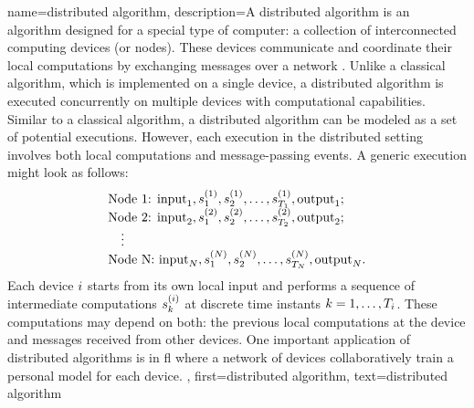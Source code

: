 {name={distributed algorithm},
	description={A distributed \gls{algorithm} is an \gls{algorithm} designed for 
		a special type of computer: a collection of interconnected computing devices (or nodes). 
		These devices communicate and coordinate their local computations by exchanging 
		messages over a network \cite{IntroDistAlg,ParallelDistrBook}. Unlike a classical \gls{algorithm}, 
		which is implemented on a single \gls{device}, a distributed \gls{algorithm} is 
		executed concurrently on multiple \gls{device}s with computational capabilities. 
		Similar to a classical \gls{algorithm}, a distributed \gls{algorithm} can be modeled as a 
		set of potential executions. However, each execution in the distributed setting involves 
		both local computations and message-passing events. A generic execution might look as 
		follows:
		\[
		\begin{array}{l}
			\text{Node 1: } {\rm input}_1, s_1^{(1)}, s_2^{(1)}, \ldots, s_{T_1}^{(1)}, {\rm output}_1; \\
			\text{Node 2: } {\rm input}_2, s_1^{(2)}, s_2^{(2)}, \ldots, s_{T_2}^{(2)}, {\rm output}_2; \\
			\quad \vdots \\
			\text{Node N: } {\rm input}_N, s_1^{(N)}, s_2^{(N)}, \ldots, s_{T_N}^{(N)}, {\rm output}_N.
		\end{array}
		\]
		Each \gls{device} $i$ starts from its own local input and performs a sequence of 
		intermediate computations $s_{k}^{(i)}$ at discrete time instants $k = 1, \dots, T_i$. 
		These computations may depend on both: the previous local computations at the \gls{device} 
		and messages received from other \gls{device}s. One important application of distributed 
		\gls{algorithm}s is in \gls{fl} where a network of \gls{device}s collaboratively train a personal \gls{model} 
		for each \gls{device}. 
		},
	first={distributed algorithm}, text={distributed algorithm}
}


